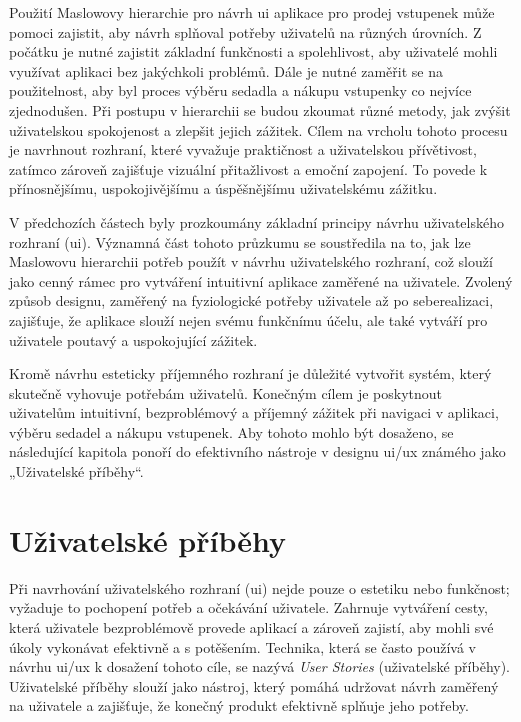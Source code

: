 Použití Maslowovy hierarchie pro návrh \ac{ui} aplikace pro prodej vstupenek může pomoci zajistit, aby návrh splňoval potřeby uživatelů na různých úrovních.
Z počátku je nutné zajistit základní funkčnosti a spolehlivost, aby uživatelé mohli využívat aplikaci bez jakýchkoli problémů.
Dále je nutné zaměřit se na použitelnost, aby byl proces výběru sedadla a nákupu vstupenky co nejvíce zjednodušen.
Při postupu v hierarchii se budou zkoumat různé metody, jak zvýšit uživatelskou spokojenost a zlepšit jejich zážitek.
Cílem na vrcholu tohoto procesu je navrhnout rozhraní, které vyvažuje praktičnost a uživatelskou přívětivost, zatímco zároveň zajišťuje vizuální přitažlivost a emoční zapojení.
To povede k přínosnějšímu, uspokojivějšímu a úspěšnějšímu uživatelskému zážitku.

V předchozích částech byly prozkoumány základní principy návrhu uživatelského rozhraní (\ac{ui}).
Významná část tohoto průzkumu se soustředila na to, jak lze Maslowovu hierarchii potřeb použít v návrhu uživatelského rozhraní, což slouží jako cenný rámec pro vytváření intuitivní aplikace zaměřené na uživatele.
Zvolený způsob designu, zaměřený na fyziologické potřeby uživatele až po seberealizaci, zajišťuje, že aplikace slouží nejen svému funkčnímu účelu, ale také vytváří pro uživatele poutavý a uspokojující zážitek.

Kromě návrhu esteticky příjemného rozhraní je důležité vytvořit systém, který skutečně vyhovuje potřebám uživatelů.
Konečným cílem je poskytnout uživatelům intuitivní, bezproblémový a příjemný zážitek při navigaci v aplikaci, výběru sedadel a nákupu vstupenek.
Aby tohoto mohlo být dosaženo, se následující kapitola ponoří do efektivního nástroje v designu \ac{ui}/\ac{ux} známého jako „Uživatelské příběhy“.

\section{Uživatelské příběhy}
\label{sec:navrh-ui-uzivatelske-pribehy}
Při navrhování uživatelského rozhraní (\ac{ui}) nejde pouze o estetiku nebo funkčnost; vyžaduje to pochopení potřeb a očekávání uživatele.
Zahrnuje vytváření cesty, která uživatele bezproblémově provede aplikací a zároveň zajistí, aby mohli své úkoly vykonávat efektivně a s potěšením.
Technika, která se často používá v návrhu \ac{ui}/\ac{ux} k dosažení tohoto cíle, se nazývá \textit{User Stories} (uživatelské příběhy).
Uživatelské příběhy slouží jako nástroj, který pomáhá udržovat návrh zaměřený na uživatele a zajišťuje, že konečný produkt efektivně splňuje jeho potřeby.

